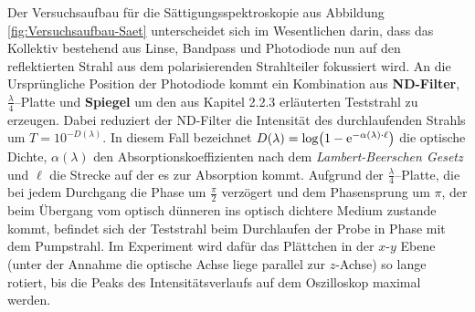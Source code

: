 \noindent Der Versuchsaufbau für die Sättigungsspektroskopie aus Abbildung \ref{fig:Versuchsaufbau-Saet} unterscheidet sich im Wesentlichen darin, dass das Kollektiv bestehend aus Linse, Bandpass und Photodiode nun auf den reflektierten Strahl aus dem polarisierenden Strahlteiler fokussiert wird. An die Ursprüngliche Position der Photodiode kommt ein Kombination aus \textbf{ND-Filter}, \textbf{$\frac{\lambda}{4}$}--Platte und \textbf{Spiegel} um den aus Kapitel 2.2.3 erläuterten Teststrahl zu erzeugen. Dabei reduziert der ND-Filter die Intensität des durchlaufenden Strahls um $T=10^{-D(\lambda)}$. In diesem Fall bezeichnet $D(\lambda)=\log(1-\mathrm{e}^{-\alpha(\lambda) \cdot \ell})$ die optische Dichte, $\alpha(\lambda)$ den Absorptionskoeffizienten nach dem \textit{Lambert-Beerschen Gesetz} und $\ell$ die Strecke auf der es zur Absorption kommt. Aufgrund der $\frac{\lambda}{4}$--Platte, die bei jedem Durchgang die Phase um $\frac{\pi}{2}$ verzögert und dem Phasensprung um $\pi$, der beim Übergang vom optisch dünneren ins optisch dichtere Medium zustande kommt, befindet sich der Teststrahl beim Durchlaufen der Probe in Phase mit dem Pumpstrahl. Im Experiment wird dafür das Plättchen in der $x$-$y$ Ebene (unter der Annahme die optische Achse liege parallel zur $z$-Achse) so lange rotiert, bis die Peaks des Intensitätsverlaufs auf dem Oszilloskop maximal werden.

\cleardoublepage{}